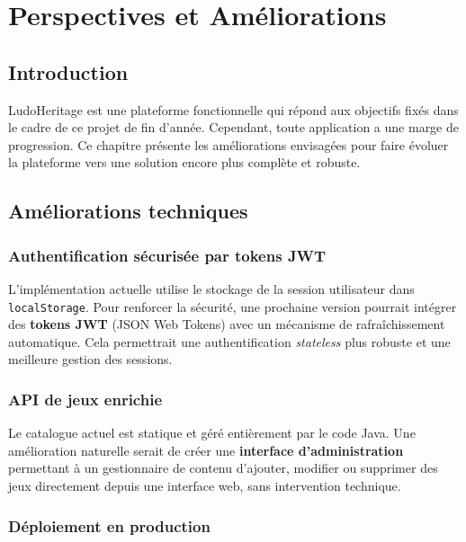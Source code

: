 \chapter{Perspectives et Améliorations}

\section{Introduction}

LudoHeritage est une plateforme fonctionnelle qui répond aux objectifs fixés dans le cadre de
ce projet de fin d'année. Cependant, toute application a une marge de progression. Ce chapitre
présente les améliorations envisagées pour faire évoluer la plateforme vers une solution encore
plus complète et robuste.

\section{Améliorations techniques}

\subsection{Authentification sécurisée par tokens JWT}

L'implémentation actuelle utilise le stockage de la session utilisateur dans \texttt{localStorage}.
Pour renforcer la sécurité, une prochaine version pourrait intégrer des \textbf{tokens JWT}
(JSON Web Tokens) avec un mécanisme de rafraîchissement automatique. Cela permettrait une
authentification \textit{stateless} plus robuste et une meilleure gestion des sessions.

\subsection{API de jeux enrichie}

Le catalogue actuel est statique et géré entièrement par le code Java. Une amélioration
naturelle serait de créer une \textbf{interface d'administration} permettant à un gestionnaire
de contenu d'ajouter, modifier ou supprimer des jeux directement depuis une interface web,
sans intervention technique.

\subsection{Déploiement en production}

